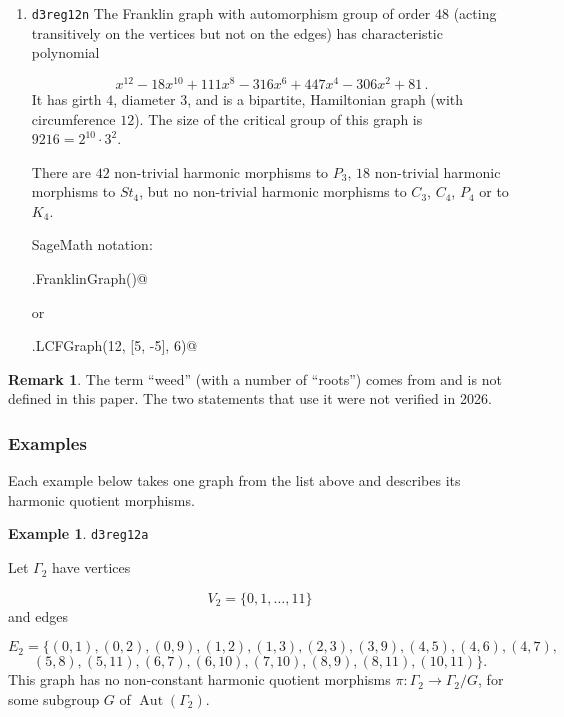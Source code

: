 \documentclass[12pt,letterpaper]{article}
\theoremstyle{definition}
\newtheorem{example}[theorem]{Example}
\newtheorem{revremark}{Remark}
\DeclareMathOperator{\Aut}{Aut}
\begin{document}
\begin{enumerate}
SageMath notation:

\verb@graphs.LCFGraph(12, [-3, 3], 6)@

\item
 {\tt d3reg12n}\newline %
The Franklin graph with automorphism group of order $48$
(acting transitively on the vertices but not on the edges)
has characteristic polynomial  

\[
x^{12} - 18x^{10} + 111x^8 - 316x^6 + 447x^4 - 306x^2 + 81 \, .
\]
It has girth $4$, diameter $3$, and is a bipartite,
Hamiltonian graph (with circumference $12$).
The size of the critical group of this graph is $9216=2^{10}\cdot 3^2$.

There are $42$ non-trivial harmonic morphisms to $P_3$,
$18$ non-trivial harmonic morphisms to $St_4$,
but no non-trivial harmonic morphisms to $C_3$, $C_4$, $P_4$ or to $K_4$.


SageMath notation:

\verb@graphs.FranklinGraph()@

\noindent
or

\verb@graphs.LCFGraph(12, [5, -5], 6)@

  
\end{enumerate}

\begin{revremark}
\label{rem:weed}
The term ``weed'' (with a number of ``roots'') comes from \cite{MJ22} and is
not defined in this paper. The two statements that use it were not
verified in 2026.
\end{revremark}
  




\subsubsection{Examples}
\label{sec:d3reg12-examples}

Each example below takes one graph from the list above and describes
its harmonic quotient morphisms.


\begin{example}%
\label{example:d3reg12a}
  {\tt d3reg12a}\newline
{\rm  
Let $\Gamma_2$ have vertices

\[
V_2=\{0,1,\dots,11\}
\]
and edges

\[
E_2 = \{
(0, 1), (0, 2), (0, 9), (1, 2), (1, 3), (2, 3), (3, 9), (4, 5), (4, 6), (4, 7), 
\]
\[
(5, 8), (5, 11), (6, 7), (6, 10), (7, 10), (8, 9), (8, 11), (10, 11)
\}.
\]
This graph has no non-constant harmonic quotient
morphisms $\pi: \Gamma_2\to \Gamma_2/G$, for some subgroup
$G$ of $\Aut(\Gamma_2)$.

}
\end{example}
\end{document}
